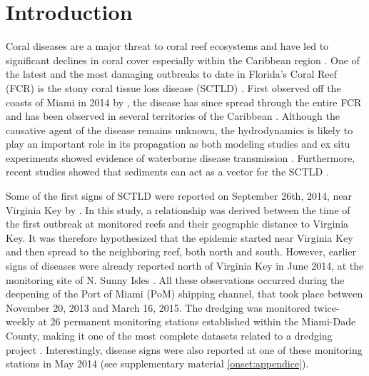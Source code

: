 \section{Introduction}

Coral diseases are a major threat to coral reef ecosystems and have led to significant declines in coral cover especially within the Caribbean region \citep{richardson1998coral, sutherland2004disease, aronson2001white, harvell2007coral, brandt2009dynamics}. One of the latest and the most damaging outbreaks to date in Florida's Coral Reef (FCR) is the stony coral tissue loss disease (SCTLD) \citep{noaa2018}. First observed off the coasts of Miami in 2014 by \cite{precht2016unprecedented}, the disease has since spread through the entire FCR \citep{muller2020spatial,dobbelaere2022connecting} and has been observed in several territories of the Caribbean \citep{kramer2019map, meiling2021variable, estrada2021effects,heres2021ecological}. Although the causative agent of the disease remains unknown, the hydrodynamics is likely to play an important role in its propagation as both modeling studies and ex situ experiments showed evidence of waterborne disease transmission \citep{aeby2019pathogenesis,dobbelaere2020coupled,eaton2021measuring, meiling2021variable}. Furthermore, recent studies showed that sediments can act as  a vector for the SCTLD \citep{rosales2020rhodobacterales, studivan2022reef}.

Some of the first signs of SCTLD were reported on September 26th, 2014, near Virginia Key by \cite{precht2016unprecedented}. In this study, a relationship was derived between the time of the first outbreak at monitored reefs and their geographic distance to Virginia Key. It was therefore hypothesized that the epidemic started near Virginia Key and then spread to the neighboring reef, both north and south. However, earlier signs of diseases were already reported north of Virginia Key in June 2014, at the monitoring site of N. Sunny Isles \citep{precht2016unprecedented}. All these observations occurred during the deepening of the Port of Miami (PoM) shipping channel, that took place between November 20, 2013 and March 16, 2015. The dredging was monitored twice-weekly at 26 permanent monitoring stations established within the Miami-Dade County, making it one of the most complete datasets related to a dredging project \citep{gintert2019regional}. Interestingly, disease signs were also reported at one of these monitoring stations in May 2014 (see supplementary material \ref{onset:appendice}).

